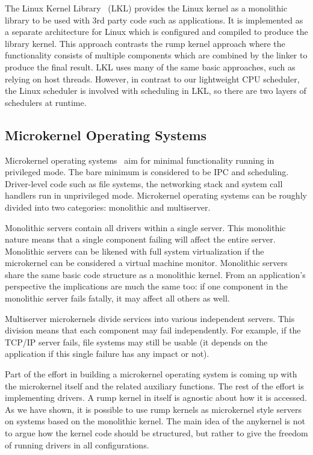 The Linux Kernel Library~\cite{purdila:lkl} (LKL) provides the Linux
kernel as a monolithic library to be used with 3rd party code such
as applications.  It is implemented as a separate architecture for
Linux which is configured and compiled to produce the library
kernel.  This approach contrasts the rump kernel approach where the
functionality consists of multiple components which are combined by
the linker to produce the final result.  LKL uses many of the same
basic approaches, such as relying on host threads.  However, in
contrast to our lightweight CPU scheduler, the Linux scheduler is
involved with scheduling in LKL, so there are two layers of
schedulers at runtime.

\subsection{Microkernel Operating Systems}

Microkernel operating
systems~\cite{accetta:mach,herder:minix3,hildebrand:qnx,liedtke:construction}
aim for minimal functionality running in privileged mode.  The bare
minimum is considered to be IPC and scheduling.  Driver-level code such
as file systems, the networking stack and system call handlers run in
unprivileged mode.  Microkernel operating systems can be roughly divided
into two categories: monolithic and multiserver.

Monolithic servers contain all drivers within a single server.
This monolithic nature means that a single component failing will affect the entire
server.  Monolithic servers can be likened with full system
virtualization if the microkernel can be considered a virtual
machine monitor.  Monolithic servers share the same basic code
structure as a monolithic kernel.  From an application's perspective
the implications are much the same too: if one component in the
monolithic server fails fatally, it may affect all others as well.

Multiserver microkernels divide services into various independent
servers.  This division means that each component may fail independently.
For example, if the TCP/IP server fails, file systems may still
be usable (it depends on the application if this single failure has any
impact or not).

Part of the effort in building a microkernel operating system is coming
up with the microkernel itself and the related auxiliary functions.
The rest of the effort is implementing drivers.  A rump kernel in itself
is agnostic about how it is accessed.  As we have shown, it is possible
to use rump kernels as microkernel style servers on systems based on the
monolithic kernel.  The main idea of the anykernel is not to argue how
the kernel code should be structured, but rather to give the freedom of
running drivers in all configurations.

